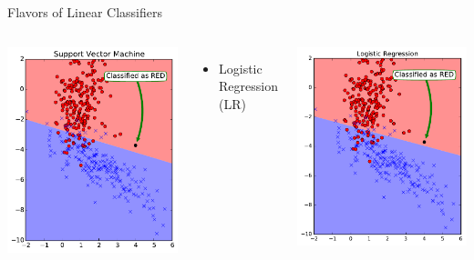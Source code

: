 \documentclass[10pt, aspectratio=169]{beamer} %
\begin{document}
\begin{frame}{Flavors of Linear Classifiers}
{\begin{columns}
\centerline{\includegraphics[width=\columnwidth]{SVM.pdf}}
\begin{itemize}
\item Logistic Regression (LR)
\end{itemize}
\centerline{\includegraphics[width=\columnwidth]{LR.pdf}}
\end{columns}
}
\end{frame}
\end{document}
